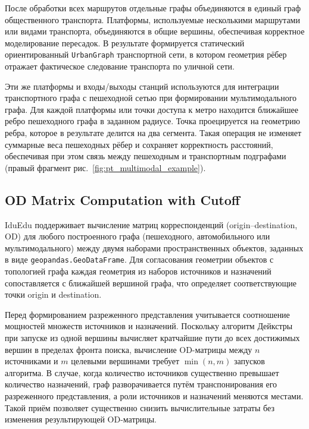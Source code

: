 \documentclass[sigconf,nonacm]{acmart}
\begin{document}
    После обработки всех маршрутов отдельные графы объединяются в единый граф общественного транспорта.
    Платформы, используемые несколькими маршрутами или видами транспорта, объединяются в общие вершины, обеспечивая корректное моделирование пересадок.
    В результате формируется статический ориентированный \texttt{UrbanGraph} транспортной сети, в котором геометрия рёбер
    отражает фактическое следование транспорта по уличной сети.

    Эти же платформы и входы/выходы станций используются для интеграции транспортного графа с пешеходной сетью при формировании мультимодального графа.
    Для каждой платформы или точки доступа к метро находится ближайшее ребро пешеходного графа в заданном радиусе.
    Точка проецируется на геометрию ребра, которое в результате делится на два сегмента.
    Такая операция не изменяет суммарные веса пешеходных рёбер и сохраняет корректность расстояний, обеспечивая
    при этом связь между пешеходным и транспортным подграфами (правый фрагмент рис.~\ref{fig:pt_multimodal_example}).

    \subsection{OD Matrix Computation with Cutoff}
    \label{subsec:od-matrix-computation-with-cutoff}

    IduEdu поддерживает вычисление матриц корреспонденций (origin--destination, OD) для любого построенного графа
    (пешеходного, автомобильного или мультимодального) между двумя наборами пространственных объектов, заданных в виде \texttt{geopandas.GeoDataFrame}.
    Для согласования геометрии объектов с топологией графа каждая геометрия из наборов источников и назначений
    сопоставляется с ближайшей вершиной графа, что определяет соответствующие точки origin и destination.

    Перед формированием разреженного представления учитывается соотношение мощностей множеств источников и назначений.
    Поскольку алгоритм Дейкстры при запуске из одной вершины вычисляет кратчайшие пути до всех достижимых вершин в пределах фронта поиска,
    вычисление OD-матрицы между $n$ источниками и $m$ целевыми вершинами требует $\min(n, m)$ запусков алгоритма.
    В случае, когда количество источников существенно превышает количество назначений, граф разворачивается путём
    транспонирования его разреженного представления, а роли источников и назначений меняются местами.
    Такой приём позволяет существенно снизить вычислительные затраты без изменения результирующей OD-матрицы.
\end{document}

